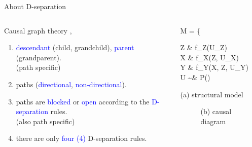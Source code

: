 \begin{frame}
	{About D-separation}
	\begin{columns}
		\begin{column}{0.5\textwidth}
			Causal graph theory \cite{Pearl_1988, Pearl_2009, Pearl_et_al_2016, Pearl_et_al_2018, Spirtes_et_al_1991},
			\begin{enumerate}
				\item \textcolor{blue}{descendant} (child, grandchild), \textcolor{blue}{parent} (grandparent). \\
				{\small \alert{(path specific)} }
				\item paths (\textcolor{blue}{directional}, \textcolor{blue}{non-directional}).
				\item paths are \textcolor{blue}{blocked} or \textcolor{blue}{open} according to the \textcolor{blue}{D-separation} rules. \\
				{\small \alert{(also path specific)} }
				\item there are only \textcolor{blue}{four (4)} D-separation rules.
			\end{enumerate}
		\end{column}
		\begin{column}{0.5\textwidth}  
			\begin{equ}
				M = \left\{ \begin{aligned} 
					Z \leftarrow & \; f_{Z}(U_{Z}) \\
					X \leftarrow & \; f_{X}(Z, U_{X}) \\
					Y \leftarrow & \; f_{Y}(X, Z, U_{Y}) \\
					U \sim & \; P()
				\end{aligned} \right
				\caption*{(a) structural model}
			\end{equ}
			\begin{figure}
				\caption*{(b) causal diagram}
			\end{figure}
		\end{column}
	\end{columns}
\end{frame}
